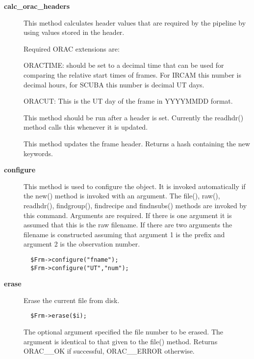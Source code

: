 \begin{description}
\item[\textbf{calc\_orac\_headers}] \mbox{}

This method calculates header values that are required by the
pipeline by using values stored in the header.



Required ORAC extensions are:



ORACTIME: should be set to a decimal time that can be used for
comparing the relative start times of frames. For IRCAM this
number is decimal hours, for SCUBA this number is decimal
UT days.



ORACUT: This is the UT day of the frame in YYYYMMDD format.



This method should be run after a header is set. Currently the readhdr()
method calls this whenever it is updated.



This method updates the frame header.
Returns a hash containing the new keywords.

\item[\textbf{configure}] \mbox{}

This method is used to configure the object. It is invoked
automatically if the new() method is invoked with an argument. The
file(), raw(), readhdr(), findgroup(), findrecipe and findnsubs()
methods are invoked by this command. Arguments are required.  If there
is one argument it is assumed that this is the raw filename. If there
are two arguments the filename is constructed assuming that argument 1
is the prefix and argument 2 is the observation number.

\begin{verbatim}
  $Frm->configure("fname");
  $Frm->configure("UT","num");
\end{verbatim}
\item[\textbf{erase}] \mbox{}

Erase the current file from disk.

\begin{verbatim}
  $Frm->erase($i);
\end{verbatim}


The optional argument specified the file number to be erased.
The argument is identical to that given to the file() method.
Returns ORAC\_\_OK if successful, ORAC\_\_ERROR otherwise.




\end{description}
